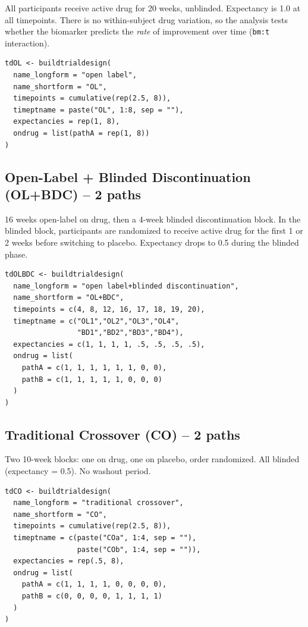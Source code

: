 \documentclass[11pt]{article}
\begin{document}
All participants receive active drug for 20 weeks, unblinded.
Expectancy is 1.0 at all timepoints. There is no within-subject
drug variation, so the analysis tests whether the biomarker
predicts the \textit{rate} of improvement over time (\texttt{bm:t}
interaction).

\begin{lstlisting}
tdOL <- buildtrialdesign(
  name_longform = "open label",
  name_shortform = "OL",
  timepoints = cumulative(rep(2.5, 8)),
  timeptname = paste("OL", 1:8, sep = ""),
  expectancies = rep(1, 8),
  ondrug = list(pathA = rep(1, 8))
)
\end{lstlisting}

\subsection{Open-Label + Blinded Discontinuation (OL+BDC) -- 2 paths}

16 weeks open-label on drug, then a 4-week blinded
discontinuation block. In the blinded block, participants are
randomized to receive active drug for the first 1 or 2 weeks
before switching to placebo. Expectancy drops to 0.5 during the
blinded phase.

\begin{lstlisting}
tdOLBDC <- buildtrialdesign(
  name_longform = "open label+blinded discontinuation",
  name_shortform = "OL+BDC",
  timepoints = c(4, 8, 12, 16, 17, 18, 19, 20),
  timeptname = c("OL1","OL2","OL3","OL4",
                 "BD1","BD2","BD3","BD4"),
  expectancies = c(1, 1, 1, 1, .5, .5, .5, .5),
  ondrug = list(
    pathA = c(1, 1, 1, 1, 1, 1, 0, 0),
    pathB = c(1, 1, 1, 1, 1, 0, 0, 0)
  )
)
\end{lstlisting}

\subsection{Traditional Crossover (CO) -- 2 paths}

Two 10-week blocks: one on drug, one on placebo, order
randomized. All blinded (expectancy = 0.5). No washout period.

\begin{lstlisting}
tdCO <- buildtrialdesign(
  name_longform = "traditional crossover",
  name_shortform = "CO",
  timepoints = cumulative(rep(2.5, 8)),
  timeptname = c(paste("COa", 1:4, sep = ""),
                 paste("COb", 1:4, sep = "")),
  expectancies = rep(.5, 8),
  ondrug = list(
    pathA = c(1, 1, 1, 1, 0, 0, 0, 0),
    pathB = c(0, 0, 0, 0, 1, 1, 1, 1)
  )
)
\end{lstlisting}
\end{document}
